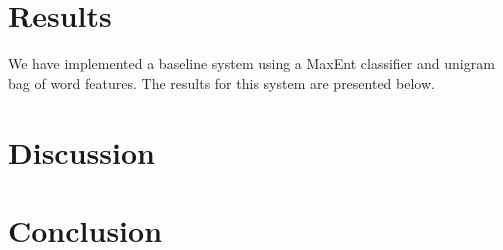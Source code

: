 \documentclass[11pt]{article}
\begin{document}
\section{Results}

We have implemented a baseline system using a MaxEnt classifier and unigram bag of word features.  The results for this system are presented below.

\section{Discussion}


\section{Conclusion}

\nocite{*}




\end{document}
